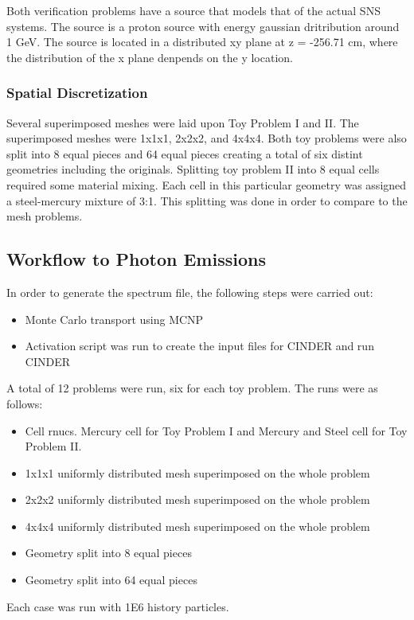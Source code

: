 Both verification problems have a source that models that of the
actual SNS systems. The source is a proton source with energy gaussian dritribution
around 1 GeV. The source is located in a distributed xy plane at z = -256.71 cm, 
where the distribution of the x plane denpends on the y location. 

\subsubsection{Spatial Discretization}
Several superimposed meshes were laid upon Toy Problem I and II. 
The superimposed meshes were 1x1x1, 2x2x2, and 4x4x4. Both toy problems
were also split into 8 equal pieces and 64 equal pieces creating a total of
six distint geometries including the originals. 
Splitting toy problem II into 8 equal cells required some material mixing. 
Each cell in this particular geometry was assigned a steel-mercury mixture
of 3:1. 
This splitting was done in order to compare to the mesh problems. 

\subsection{Workflow to Photon Emissions}
In order to generate the spectrum file, the following steps were carried out:
\begin{itemize}
\item Monte Carlo transport using MCNP 
\item Activation script was run to create the input files for CINDER and  run CINDER
\end{itemize}
A total of 12 problems were run, six for each toy problem. The runs were as follows:
\begin{itemize}
\item Cell rnucs. Mercury cell for Toy Problem I and Mercury and Steel cell for 
Toy Problem II.
\item 1x1x1 uniformly distributed mesh superimposed on the whole problem
\item 2x2x2 uniformly distributed mesh superimposed on the whole problem
\item 4x4x4 uniformly distributed mesh superimposed on the whole problem
\item Geometry split into 8 equal pieces
\item Geometry split into 64 equal pieces
\end{itemize}
Each case was run with 1E6 history particles. 

\newpage
